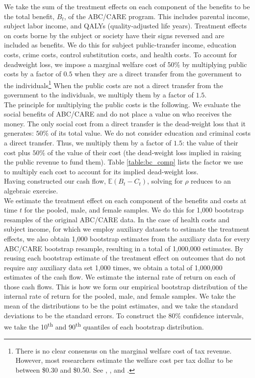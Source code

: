 \noindent We take the sum of the treatment effects on each component of the benefits to be the total benefit, $B_t$, of the ABC/CARE program. This includes parental income, subject labor income, and QALYs (quality-adjusted life years). Treatment effects on costs borne by the subject or society have their signs reversed and are included as benefits. We do this for subject public-transfer income, education costs, crime costs, control substitution costs, and health costs. To account for deadweight loss, we impose a marginal welfare cost of 50\% by multiplying public costs by a factor of $0.5$ when they are a direct transfer from the government to the individuals\footnote{There is no clear consensus on the marginal welfare cost of tax revenue. However, most researchers estimate the welfare cost per tax dollar to be between \$0.30 and \$0.50. See \citet{Feldstein_1999_REStat}, \citet{Heckman_Smith_1998_evaluating}, and \citet{Browning_1987_AER}.} When the public costs are not a direct transfer from the government to the individuals, we multiply them by a factor of $1.5$.\\

\noindent The principle for multiplying the public costs is the following. We evaluate the social benefits of ABC/CARE and do not place a value on who receives the money. The only social cost from a direct transfer is the dead-weight loss that it generates: $50\%$ of its total value. We do not consider education and criminal costs a direct transfer. Thus, we multiply them by a factor of $1.5$: the value of their cost plus $50\%$ of the value of their cost (the dead-weight loss implied in raising the public revenue to fund them). Table \ref{table:bc_comp} lists the factor we use to multiply each cost to account for its implied dead-weight loss.\\

\noindent Having constructed our cash flow, $\mathbb{E} (B_t - C_t)$, solving for $\rho$
reduces to an algebraic exercise.\\

\noindent We estimate the treatment effect on each
component of the benefits and costs at time $t$ for the pooled, male, and
female samples. We do this for 1,000 bootstrap resamples of the original ABC/CARE data.
In the case of health costs and subject income, for which we employ auxiliary datasets to
estimate the treatment effects, we also obtain 1,000 bootstrap estimates from the auxiliary data
for every ABC/CARE bootstrap resample, resulting in a total of 1,000,000 estimates.
By reusing each bootstrap estimate of the treatment effect on outcomes that do not require any auxiliary data
set 1,000 times, we obtain a total of 1,000,000 estimates of the cash flow.
We estimate the internal rate of return on each of those cash flows.
This is how we form our empirical bootstrap distribution of the internal rate of return for the pooled, male, and female samples.
We take the mean of the distributions to be the point estimates, and we take the standard deviations
to be the standard errors. To construct the 80\% confidence intervals, we take the 10\textsuperscript{th}
and 90\textsuperscript{th} quantiles of each bootstrap distribution. \\

